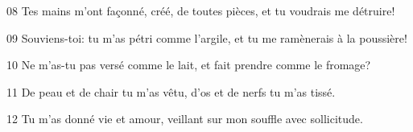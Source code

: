 08 Tes mains m’ont façonné, créé, de toutes pièces, et tu voudrais me détruire!

09 Souviens-toi: tu m’as pétri comme l’argile, et tu me ramènerais à la poussière!

10 Ne m’as-tu pas versé comme le lait, et fait prendre comme le fromage?

11 De peau et de chair tu m’as vêtu, d’os et de nerfs tu m’as tissé.

12 Tu m’as donné vie et amour, veillant sur mon souffle avec sollicitude.